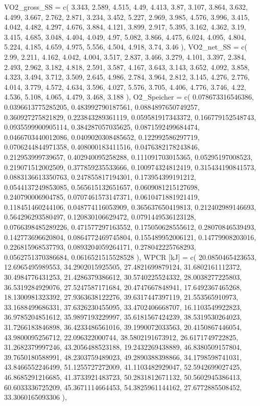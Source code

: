 \documentclass[
  letterpaper,
  DIV=11]{scrartcl}
\newenvironment{Shaded}{\begin{snugshade}}{\end{snugshade}}
\newcommand{\NormalTok}[1]{\textcolor[rgb]{0.00,0.23,0.31}{#1}}
\begin{document}
\begin{Shaded}
\begin{Highlighting}[]
\NormalTok{  \textasciigrave{}VO2\_gross\_SS\textasciigrave{} = c( 3.343, 2.589, 4.515, 4.49, 4.413, 3.87, 3.107, 3.864, 3.632, 4.499, 3.667, 2.762, 2.871, 3.234, 3.452, 5.227, 2.969, 3.985, 4.576, 3.996, 3.415, 4.042, 4.482, 4.297, 4.676, 3.884, 4.121, 3.899, 2.917, 5.395, 3.162, 4.362, 3.19, 3.415, 4.685, 3.048, 4.404, 4.049, 4.97, 5.082, 3.866, 4.475, 6.024, 4.095, 4.804, 5.224, 4.185, 4.659, 4.975, 5.556, 4.504, 4.918, 3.74, 3.46 ),}
\NormalTok{  \textasciigrave{}VO2\_net\_SS\textasciigrave{} = c( 2.99, 2.211, 4.162, 4.042, 4.004, 3.517, 2.837, 3.466, 3.279, 4.101, 3.397, 2.384, 2.493, 2.962, 3.182, 4.818, 2.591, 3.587, 4.167, 3.643, 3.143, 3.652, 4.092, 3.858, 4.323, 3.494, 3.712, 3.509, 2.645, 4.986, 2.784, 3.964, 2.812, 3.145, 4.276, 2.776, 4.014, 3.779, 4.572, 4.634, 3.596, 4.027, 5.576, 3.705, 4.406, 4.776, 3.746, 4.22, 4.536, 5.108, 4.065, 4.479, 3.468, 3.188 ),}
\NormalTok{  \textasciigrave{}O2\_Speicher\textasciigrave{} = c( 0.078673316546386, 0.0396613775285205, 0.483992790187561, 0.0884897650749257, 0.360927275821829, 0.223843289361119, 0.059581917343372, 0.166779152548743, 0.0935599900905114, 0.384287057035625, 0.0871592499684474, 0.0466703440012086, 0.0409020308485652, 0.122992586297719, 0.0706244844971358, 0.408000183411516, 0.0476382178243846, 0.212953999739657, 0.402940095258288, 0.111091703015365, 0.05295197008523, 0.219071512002509, 0.377859235533666, 0.100974324812419, 0.315434190841573, 0.0883136613350763, 0.247855817194301, 0.173954399191212, 0.0544137249853085, 0.565615132651657, 0.0609081215127698, 0.240790006904785, 0.0707461573147371, 0.0610471881921419, 0.118451460244106, 0.048774116053909, 0.365637650419813, 0.212402989146693, 0.564296293580497, 0.120830106629472, 0.0791449536123128, 0.0766398485289226, 0.471577297163552, 0.175050628555612, 0.28070846539493, 0.142773696620804, 0.0864772469745804, 0.155489952006121, 0.14779908203016, 0.226815968537793, 0.0893204059264171, 0.278042225768293, 0.0562751370386684, 0.0616521515528528 ),}
\NormalTok{  \textasciigrave{}WPCR [kJ]\textasciigrave{} = c( 20.0850465423653, 12.6965495989553, 34.2902015925505, 27.4821699879124, 31.6802161112372, 30.4984776431253, 21.4286379386612, 30.5740225524332, 28.0038277225803, 36.5319284929076, 27.5247587171684, 20.4747667848941, 17.6492367465268, 18.1300981323392, 27.9363638122276, 39.6317447397119, 21.553565910973, 33.1688499686331, 37.6326230455095, 33.4702406668707, 16.1103549922823, 36.9785204851612, 35.9897193229997, 35.6181567424239, 38.5319530264023, 31.7266183846898, 36.4233486561016, 39.1990072033563, 20.4150867446054, 43.9800095256712, 22.096322000744, 38.5802191673912, 26.6171749722825, 31.2682379997246, 43.2056488523188, 19.2432269438889, 46.8380509157804, 39.7650180588991, 48.2303759489023, 49.2890388398866, 34.1798598741031, 43.8466552246499, 51.1255727272009, 41.1103482929047, 52.5942699027425, 46.8685291216685, 41.3733921483723, 50.2831812671132, 50.5602945386413, 60.6033336725209, 45.3671114664453, 54.3825961144162, 27.6772885508452, 33.3060165093306 ),}

\end{Highlighting}
\end{Shaded}
\end{document}
